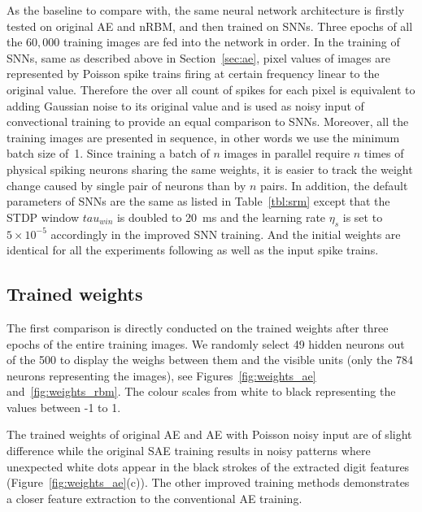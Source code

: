 As the baseline to compare with, the same neural network architecture is firstly tested on original AE and nRBM, and then trained on SNNs.
Three epochs of all the $60,000$ training images are fed into the network in order.
In the training of SNNs, same as described above in Section~\ref{sec:ae}, pixel values of images are represented by Poisson spike trains firing at certain frequency linear to the original value.
Therefore the over all count of spikes for each pixel is equivalent to adding Gaussian noise to its original value and is used as noisy input of convectional training to provide an equal comparison to SNNs.
Moreover, all the training images are presented in sequence, in other words we use the minimum batch size of~1.
Since training a batch of $n$ images in parallel require $n$ times of physical spiking neurons sharing the same weights, it is easier to track the weight change caused by single pair of neurons than by $n$ pairs.
In addition, the default parameters of SNNs are the same as listed in Table~\ref{tbl:srm} except that the STDP window $tau_{win}$ is doubled to 20~ms and the learning rate $\eta_s$ is set to $5 \times 10^{-5}$ accordingly in the improved SNN training.
And the initial weights are identical for all the experiments following as well as the input spike trains.


\subsection{Trained weights}
The first comparison is directly conducted on the trained weights after three epochs of the entire training images.
We randomly select 49 hidden neurons out of the 500 to display the weighs between them and the visible units (only the 784 neurons representing the images), see Figures~\ref{fig:weights_ae} and~\ref{fig:weights_rbm}.
The colour scales from white to black representing the values between -1 to 1.

The trained weights of original AE and AE with Poisson noisy input are of slight difference while the original SAE training results in noisy patterns where unexpected white dots appear in the black strokes of the extracted digit features (Figure~\ref{fig:weights_ae}(c)).
The other improved training methods demonstrates a closer feature extraction to the conventional AE training.


